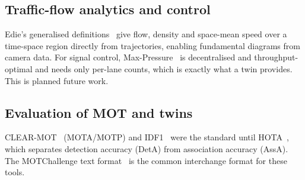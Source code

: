 \documentclass[11pt,a4paper]{article}
\begin{document}
\subsection{Traffic-flow analytics and control}
Edie's generalised definitions~\cite{edie1963} give flow, density and space-mean speed over a time-space region
directly from trajectories, enabling fundamental diagrams from camera data. For signal control, Max-Pressure~\cite{varaiya2013}
is decentralised and throughput-optimal and needs only per-lane counts, which is exactly what a twin provides.
This is planned future work.

\subsection{Evaluation of MOT and twins}
CLEAR-MOT~\cite{bernardin2008} (MOTA/MOTP) and IDF1~\cite{ristani2016} were the standard until HOTA~\cite{luiten2021},
which separates detection accuracy (DetA) from association accuracy (AssA). The MOTChallenge text format~\cite{milan2016}
is the common interchange format for these tools.
\end{document}
